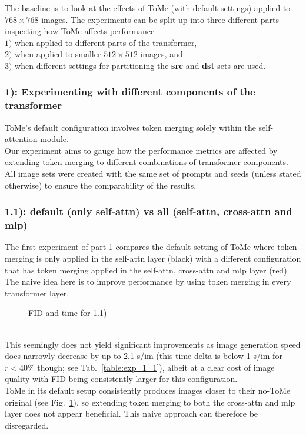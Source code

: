 The baseline is to look at the effects of ToMe (with default settings) applied to $768 \times 768$ images. The experiments can be split up into three different parts inspecting how ToMe affects performance\\ \(1)\) when applied to different parts of the transformer,\\ \(2)\) when applied to smaller $512 \times 512$ images, and\\ \(3)\) when different settings for partitioning the \textbf{src} and \textbf{dst} sets are used.

\subsubsection*{1): Experimenting with different components of the transformer}
ToMe's default configuration involves token merging solely within the self-attention module.\\
Our experiment aims to gauge how the performance metrics are affected by extending token merging to different combinations of transformer components.\\
All image sets were created with the same set of prompts and seeds (unless stated otherwise) to ensure the comparability of the results.



\subsubsection*{1.1): default (only self-attn) vs all (self-attn, cross-attn and mlp)}
The first experiment of part 1 compares the default setting of ToMe where token merging is only applied in the self-attn layer (black) with a different configuration that has token merging applied in the self-attn, cross-attn and mlp layer (red). 
The naive idea here is to improve performance by using token merging in every transformer layer.
\begin{figure}[!htb]
\label{fig:exp_1_1}
   
   
\caption{FID and time for 1.1)}
\label{fig:exp_1_1}
\end{figure}\\
This seemingly does not yield significant improvements as image generation speed does narrowly decrease by up to 2.1 s/im (this time-delta is below 1 s/im for $r<40\%$ though; see Tab.~\ref{table:exp_1_1}), albeit at a clear cost of image quality with FID being consistently larger for this configuration. \\
ToMe in its default setup consistently produces images closer to their no-ToMe original (see Fig.~\ref{fig:exp_1_1}), so extending token merging to both the cross-attn and mlp layer does not appear beneficial. This naive approach can therefore be disregarded.



